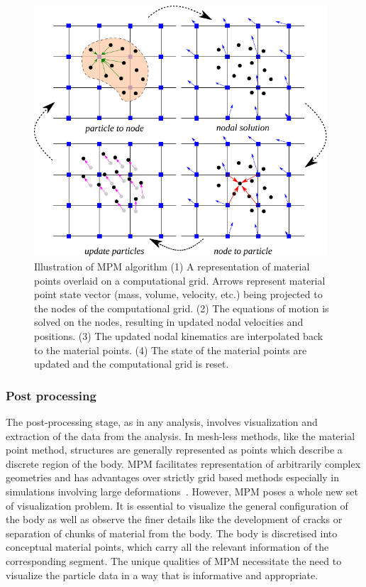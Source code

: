 \begin{figure}[htbp]
\centering
\includegraphics[width=0.975\textwidth]{MPMsteps}
\caption[Illustration of the MPM algorithm]{Illustration of MPM algorithm (1) A 
representation of material points overlaid on a computational grid. Arrows 
represent material point state vector (mass, volume, velocity, etc.) being 
projected to the nodes of the computational grid. (2) The equations of motion 
is solved on the nodes, resulting in updated nodal velocities and positions. 
(3) The updated nodal kinematics are interpolated back to the material points. 
(4)  The state of the material points are updated and the computational grid is 
reset.} 
\label{fig:MPMsteps}
\end{figure}

\subsubsection{Post processing}

The post-processing stage, as in any analysis, involves visualization 
and extraction of the data from the analysis. In mesh-less methods, like the 
material point method, structures are generally represented as points which 
describe a discrete region of the body. MPM facilitates representation of 
arbitrarily complex geometries and has advantages over strictly grid based 
methods especially in simulations involving large 
deformations~\citep{Bardenhagen2000}. However, MPM poses a whole new set of 
visualization problem. It is essential to visualize the general configuration 
of the body as well as observe the finer details like the development of cracks 
or separation of chunks of material from the body. The body is discretised into 
conceptual material points, which carry all the relevant information of the 
corresponding segment. The unique qualities of MPM necessitate the need to 
visualize the particle data in a way that is informative and appropriate.

